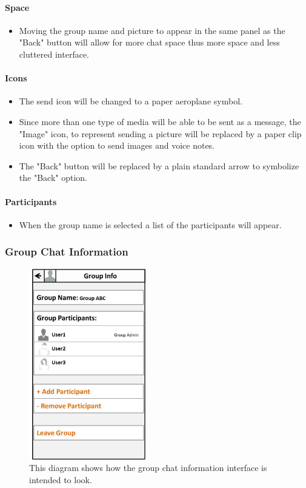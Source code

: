 \documentclass[11pt]{article}
\begin{document}
\paragraph{Space}
\begin{itemize}
\item	Moving the group name and picture to appear in the same panel as the "Back" button will allow for more chat space thus more space and less cluttered interface.
\end{itemize}

\paragraph{Icons}
\begin{itemize}
\item	The send icon will be changed to a paper aeroplane symbol.  
\item Since more than one type of media will be able to be sent as a message, the "Image" icon, to represent sending a picture will be replaced by a paper clip icon with the option to send images and voice notes. 
\item The "Back" button will be replaced by a plain standard arrow to symbolize the "Back" option.  
\end{itemize}

\paragraph{Participants}
\begin{itemize}
\item	When the group name is selected a list of the participants will appear.
\end{itemize}


\subsubsection{Group Chat Information}
\begin{figure}[H]
\centering
\includegraphics[width=2in]{./images/SettingF.jpg}
\caption[Sample Group Chat Information Screen]{This diagram shows how the group chat information interface is intended to look.}
\label{cd-group-chat-settings-interface}
\end{figure}
\end{document}
